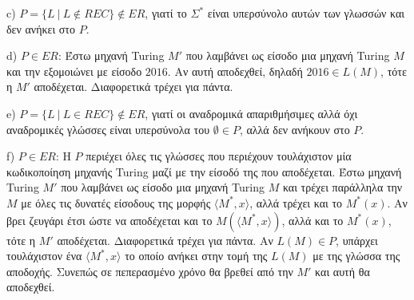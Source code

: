 \documentclass[a4paper, oneside, 11pt]{article}
\theoremstyle{definition}
\begin{document}
c) $P=\{L\ |\ L\notin REC\}\notin ER$, γιατί το $\Sigma^*$ είναι υπερσύνολο αυτών των γλωσσών και δεν ανήκει στο $P$.

d) $P\in ER$: Έστω μηχανή Turing $M'$ που λαμβάνει ως είσοδο μια μηχανή Turing $M$ και την εξομοιώνει με είσοδο $2016$. Αν αυτή αποδεχθεί, δηλαδή $2016\in L(M)$, 
τότε η $M'$ αποδέχεται. Διαφορετικά τρέχει για πάντα.

e) $P=\{L\ |\ L\in REC\}\notin ER$, γιατί οι αναδρομικά απαριθμήσιμες αλλά όχι αναδρομικές γλώσσες είναι υπερσύνολα του $\emptyset\in P$, αλλά δεν ανήκουν στο $P$.

f) $P\in ER$: Η $P$ περιέχει όλες τις γλώσσες που περιέχουν τουλάχιστον μία κωδικοποίηση μηχανής Turing μαζί με την είσοδό της που αποδέχεται.
Έστω μηχανή Turing $Μ'$ που λαμβάνει ως είσοδο μια μηχανή Turing $M$ και τρέχει παράλληλα την $M$ με όλες τις δυνατές είσοδους της μορφής $\langle M^*, x\rangle$, αλλά τρέχει
και το $M^*(x)$. Αν βρει ζευγάρι έτσι ώστε να αποδέχεται και το $M(\langle M^*, x\rangle)$, αλλά και το $M^*(x)$, τότε η $M'$ αποδέχεται. Διαφορετικά τρέχει για πάντα.
Αν $L(M)\in P$, υπάρχει τουλάχιστον ένα $\langle M^*, x\rangle$ το οποίο ανήκει στην τομή της $L(M)$ με της γλώσσα της αποδοχής. Συνεπώς σε πεπερασμένο χρόνο θα βρεθεί από την
$M'$ και αυτή θα αποδεχθεί.
\end{document}
